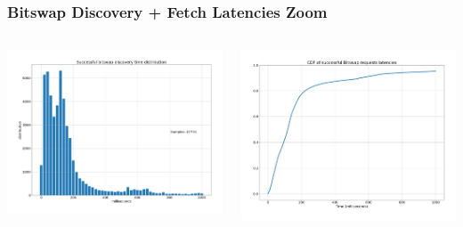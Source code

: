 \documentclass{../pl-slide}
\begin{document}
\begin{frame}
\frametitle{Bitswap Discovery + Fetch Latencies Zoom}
\begin{columns}[onlytextwidth]
\begin{column}{0.49\textwidth}
    \begin{center}
                \includegraphics[width=\textwidth]{plots/pdf1.png}
    \end{center}
\end{column}
\begin{column}{0.49\textwidth}
    \begin{center}
                \includegraphics[width=\textwidth]{plots/cdf1.png}
    \end{center}
\end{column}
\end{columns}
\end{frame}
\end{document}
